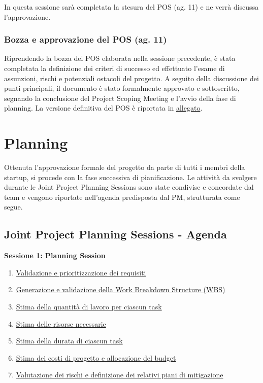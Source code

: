\documentclass[11pt,a4paper]{article}
\providecommand{\tightlist}{\setlength{\itemsep}{0pt}\setlength{\parskip}{0pt}}
\begin{document}
{In questa sessione sarà completata la stesura del POS (ag. 11) e ne verrà discussa l’approvazione.}

\subsubsection{\texorpdfstring{{Bozza e approvazione del POS (ag. 11)}}{Bozza e approvazione del POS (ag. 11)}}\label{h.xg0fhpjfk7tq}

{Riprendendo la bozza del POS elaborata nella sessione precedente, è stata completata la definizione dei criteri di successo ed effettuato l’esame di assunzioni, rischi e potenziali ostacoli del progetto. A seguito della discussione dei punti principali, il documento è stato formalmente approvato e sottoscritto, segnando la conclusione del Project Scoping Meeting e l’avvio della fase di planning. La versione definitiva del POS è riportata in \hyperref[sec:pos]{allegato}.}

\newpage
\section{\texorpdfstring{{Planning}}{Planning}}\label{h.gyro4eqy7esg}

{Ottenuta l’approvazione formale del progetto da parte di tutti i membri della startup, si procede con la fase successiva di pianificazione. Le attività da svolgere durante le Joint Project Planning Sessions sono state condivise e concordate dal team e vengono riportate nell’agenda predisposta dal PM, strutturata come segue.}

\subsection{\texorpdfstring{{Joint Project Planning Sessions - }{Agenda}}{Joint Project Planning Sessions - Agenda}}\label{h.cw4zxqdh87i1}

\medskip\noindent\textbf{Sessione 1: Planning Session}\par\nopagebreak\smallskip

\begin{enumerate}
\tightlist
\item
  \hyperref[h.4q3lmdu7d554]{Validazione e prioritizzazione dei requisiti}
\item
  \hyperref[h.x8762hc8x3x7]{Generazione e validazione della Work Breakdown Structure (WBS)}
\item
  \hyperref[h.guz3vsadgoq]{Stima della quantità di lavoro per ciascun task}
\item
  \hyperref[h.z5ofgy59hukm]{Stima delle risorse necessarie}
\item
  \hyperref[h.ufg7psybxgew]{Stima della durata di ciascun task}
\item
  \hyperref[h.turmc49m82s]{Stima dei costi di progetto e allocazione del budget}
\item
  \hyperref[h.m0dt63pfa45s]{Valutazione dei rischi e definizione dei relativi piani di mitigazione}
\end{enumerate}
\end{document}
